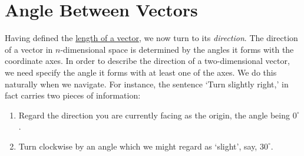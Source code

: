 \section{Angle Between Vectors}
\label{sec:angle-between-vectors}

Having defined the \hyperref[def:length-of-a-vector]{length of a vector}, we now
turn to its \emph{direction}. The direction of a vector in $n$-dimensional space
is determined by the angles it forms with the coordinate axes. In order to
describe the direction of a two-dimensional vector, we need specify the angle it
forms with at least one of the axes. We do this naturally when we navigate. For
instance, the sentence `Turn slightly right,' in fact carries two pieces of
information:
\begin{enumerate}
 \item Regard the direction you are currently facing as the origin, the angle
  being $0^{ \circ }$.
 \item Turn clockwise by an angle which we might regard as `slight', say,
  $30^{ \circ }$.
\end{enumerate}

